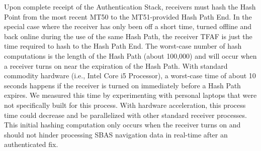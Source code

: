 \documentclass[APA,STIX1COL]{IONjournal/ION-APA Template}
\begin{document}
		Upon complete receipt of the Authentication Stack, receivers must hash the Hash Point from the most recent MT50 to the MT51-provided Hash Path End.
		In the special case where the receiver has only been off a short time, turned offline and back online during the use of the same Hash Path, the receiver TFAF is just the time required to hash to the Hash Path End.
		The worst-case number of hash computations is the length of the Hash Path (about 100,000) and will occur when a receiver turns on near the expiration of the Hash Path.
		With standard commodity hardware (i.e., Intel Core i5 Processor), a worst-case time of about 10 seconds happens if the receiver is turned on immediately before a Hash Path expires.
		We measured this time by experimenting with personal laptops that were not specifically built for this process.
		With hardware acceleration, this process time could decrease and be parallelized with other standard receiver processes.
		This initial hashing computation only occurs when the receiver turns on and should not hinder processing SBAS navigation data in real-time after an authenticated fix.

\end{document}
